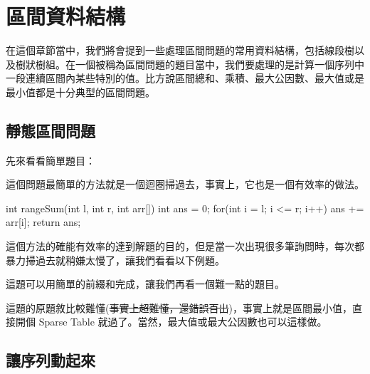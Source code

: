 \documentclass[main.tex]{subfiles}
\begin{document}
\chapter{區間資料結構}

在這個章節當中，我們將會提到一些處理區間問題的常用資料結構，包括線段樹以及樹狀樹組。在一個被稱為區間問題的題目當中，我們要處理的是計算一個序列中一段連續區間內某些特別的值。比方說區間總和、乘積、最大公因數、最大值或是最小值都是十分典型的區間問題。\\

\section{靜態區間問題}

先來看看簡單題目：\\


這個問題最簡單的方法就是一個迴圈掃過去，事實上，它也是一個有效率的做法。\\

\begin{C++}
int rangeSum(int l, int r, int arr[]){
	int ans = 0;	
	for(int i = l; i <= r; i++)
		ans += arr[i];
	return ans;
}
\end{C++}

這個方法的確能有效率的達到解題的目的，但是當一次出現很多筆詢問時，每次都暴力掃過去就稍嫌太慢了，讓我們看看以下例題。


這題可以用簡單的前綴和完成，讓我們再看一個難一點的題目。\\


這題的原題敘比較難懂(\sout{事實上超難懂，還錯誤百出})，事實上就是區間最小值，直接開個 Sparse Table 就過了。當然，最大值或最大公因數也可以這樣做。

\section{讓序列動起來}
\end{document}

